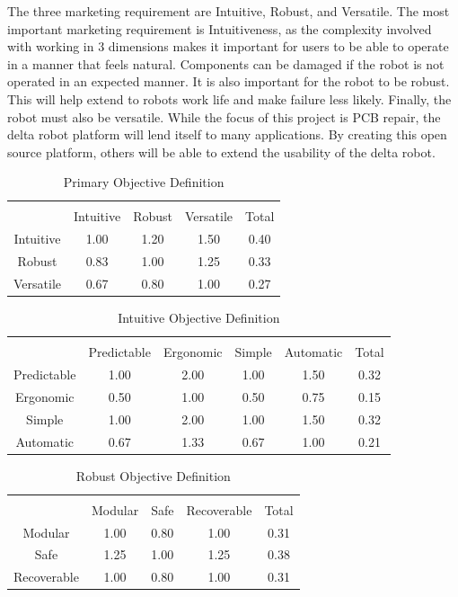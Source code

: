 \documentclass[11pt]{report}
\begin{document}
\par The three marketing requirement are Intuitive, Robust, and Versatile. The most important marketing requirement is Intuitiveness, as the complexity involved with working in 3 dimensions makes it important for users to be able to operate in a manner that feels natural. Components can be damaged if the robot is not operated in an expected manner. It is also important for the robot to be robust. This will help extend to robots work life and make failure less likely. Finally, the robot must also be versatile. While the focus of this project is PCB repair, the delta robot platform will lend itself to many applications. By creating this open source platform, others will be able to extend the usability of the delta robot.

\begin{table}[ht] 
	\caption{Primary Objective Definition}
	\label{table:primary}
	\centering 
	\begin{tabular}{c c c c c} 
		\hline\hline \\
		 			& Intuitive 	& Robust 		& Versatile 	& Total\\ 
		Intuitive 	& 1.00 		& 1.20 		& 1.50 		& 0.40 \\ 
		Robust 		& 0.83 		& 1.00 		& 1.25		& 0.33 \\ 
		Versatile 	& 0.67 		& 0.80 		& 1.00 		& 0.27 \\ 
	\end{tabular} 
\end{table}

\begin{table}[ht] 
	\caption{Intuitive Objective Definition}
	\label{table:intuitive}
	\centering 
	\begin{tabular}{c c c c c c} 
		\hline\hline \\
		 			& Predictable	& Ergonomic	& Simple 		& Automatic 	& Total\\ 
		Predictable 	& 1.00 		& 2.00 		& 1.00 		& 1.50 		& 0.32 \\ 
		Ergonomic		& 0.50 		& 1.00 		& 0.50		& 0.75 		& 0.15 \\ 
		Simple	 	& 1.00 		& 2.00 		& 1.00 		& 1.50 		& 0.32 \\ 
		Automatic	 	& 0.67		& 1.33 		& 0.67 		& 1.00 		& 0.21 \\ 
	\end{tabular} 
\end{table}

\begin{table}[ht] 
	\caption{Robust Objective Definition}
	\label{table:robust}
	\centering 
	\begin{tabular}{c c c c c} 
		\hline\hline \\
		 			& Modular 	& Safe 		& Recoverable	& Total\\ 
		Modular	 	& 1.00 		& 0.80		& 1.00 		& 0.31 \\ 
		Safe 		& 1.25		& 1.00 		& 1.25		& 0.38 \\ 
		Recoverable 	& 1.00 		& 0.80 		& 1.00 		& 0.31 \\ 
	\end{tabular} 
\end{table}
\end{document}
